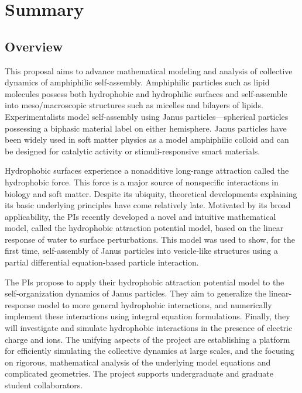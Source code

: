 \documentclass[10pt]{article}
\begin{document}
\section*{Summary}


\subsection*{Overview}
\vspace{-0.1in}
This proposal aims to advance mathematical modeling and analysis of collective dynamics of amphiphilic self-assembly.  Amphiphilic particles such as lipid molecules possess both hydrophobic and hydrophilic surfaces and self-assemble into meso/macroscopic structures such as micelles and bilayers of lipids.  Experimentalists model self-assembly using Janus particles—spherical particles possessing a biphasic material label on either hemisphere.  Janus particles have been widely used in soft matter physics as a model amphiphilic colloid and can be designed for catalytic activity or stimuli-responsive smart materials.

Hydrophobic surfaces experience a nonadditive long-range attraction called the hydrophobic force.  This force is a major source of nonspecific interactions in biology and soft matter.  Despite its ubiquity, theoretical developments explaining its basic underlying principles have come relatively late.  Motivated by its broad applicability, the PIs recently developed a novel and intuitive mathematical model, called the hydrophobic attraction potential model, based on the linear response of water to surface perturbations. This model was used to show, for the first time, self-assembly of Janus particles into vesicle-like structures using a partial differential equation-based particle interaction.

The PIs propose to apply their hydrophobic attraction potential model to the self-organization dynamics of Janus particles.  They aim to generalize the linear-response model to more general hydrophobic interactions, and numerically implement these interactions using integral equation formulations.  Finally, they will investigate and simulate hydrophobic interactions in the presence of electric charge and ions. The unifying aspects of the project are establishing a platform for efficiently simulating the collective dynamics at large scales, and the focusing on rigorous, mathematical analysis of the underlying model equations and complicated geometries.  The project supports undergraduate and graduate student collaborators. 
\end{document}
